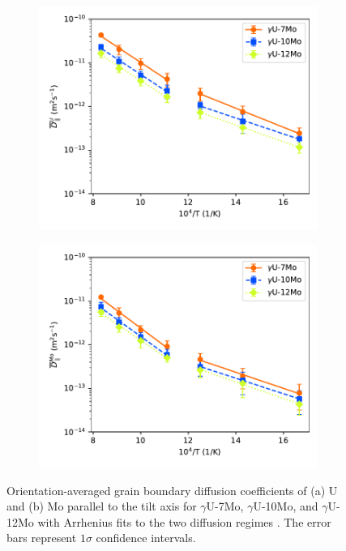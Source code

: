 \documentclass{elsarticle}
\providecommand{\DIFadd}[1]{{\protect\color{blue} \sf #1}} %
\providecommand{\DIFaddFL}[1]{\DIFadd{#1}} %
\providecommand{\DIFaddbeginFL}{} %
\providecommand{\DIFaddendFL}{} %
\begin{document}
\begin{figure}[!ht]
\begin{subfigure}{0.49\textwidth}
	\centering
	\caption{}
	\includegraphics[width=\textwidth]{2reg_U_Dz.pdf}
\end{subfigure}
\begin{subfigure}{0.49\textwidth}
	\centering
	\caption{}
	\includegraphics[width=\textwidth]{2reg_Mo_Dz.pdf}
\end{subfigure}
\caption{Orientation-averaged grain boundary diffusion coefficients of (a) U and (b) Mo parallel to the tilt axis for $\gamma$U-7Mo, $\gamma$U-10Mo, and $\gamma$U-12Mo with Arrhenius fits to the two diffusion regimes\DIFaddbeginFL \DIFaddFL{. The error bars represent $1\sigma$ confidence intervals}\DIFaddendFL .}
\label{fig:2reg}
\end{figure}
\end{document}

